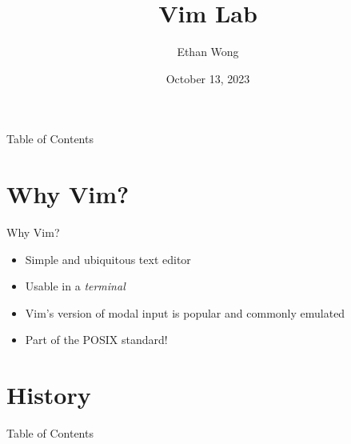 \documentclass{beamer}
\title{Vim Lab}
\author{Ethan Wong}
\date{October 13, 2023}
\institute{Linux Users Group @ UIC}
\begin{document}
\begin{frame}
	\titlepage
\end{frame}

\begin{frame}{Table of Contents}
	\tableofcontents[pausesections]
\end{frame}

\section{Why Vim?}
\begin{frame}{Why Vim?}
	\begin{itemize}
		\item Simple and ubiquitous text editor 
		\item Usable in a \textit{terminal}
		\item Vim's version of modal input is popular and commonly emulated
		\item Part of the POSIX standard!
	\end{itemize}
\end{frame}

\section{History}
\begin{frame}{Table of Contents}
	\tableofcontents[currentsection]
\end{frame}
\end{document}
